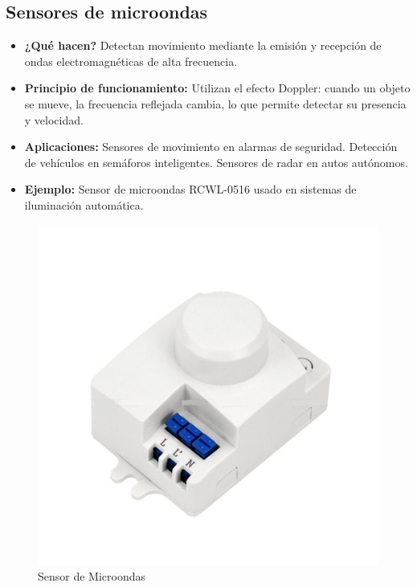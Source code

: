 \subsection*{Sensores de microondas}
\begin{itemize}
	\item \textbf{¿Qué hacen?} Detectan movimiento mediante la emisión y recepción de ondas electromagnéticas de alta frecuencia.
	\item \textbf{Principio de funcionamiento:} Utilizan el efecto Doppler: cuando un objeto se mueve, la frecuencia reflejada cambia, lo que permite detectar su presencia y velocidad.
	\item \textbf{Aplicaciones:} Sensores de movimiento en alarmas de seguridad.
	Detección de vehículos en semáforos inteligentes.
	Sensores de radar en autos autónomos.
	\item \textbf{Ejemplo:} Sensor de microondas RCWL-0516 usado en sistemas de iluminación automática.
\end{itemize}
\begin{figure}[h]
	\centering
	\includegraphics[width=0.3\linewidth]{img/sensor de microondas}
	\caption{Sensor de Microondas}
	\label{fig:sensor de microondas}
\end{figure}

